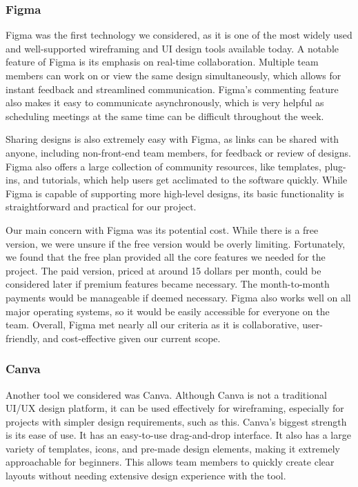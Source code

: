 \documentclass[12pt]{article}
\begin{document}
\subsubsection{Figma}
Figma was the first technology we considered, as it is one of the most widely used and well-supported wireframing and UI design tools available today. A notable feature of Figma is its emphasis on real-time collaboration. Multiple team members can work on or view the same design simultaneously, which allows for instant feedback and streamlined communication. Figma’s commenting feature also makes it easy to communicate asynchronously, which is very helpful as scheduling meetings at the same time can be difficult throughout the week.

Sharing designs is also extremely easy with Figma, as links can be shared with anyone, including non-front-end team members, for feedback or review of designs. Figma also offers a large collection of community resources, like templates, plug-ins, and tutorials, which help users get acclimated to the software quickly. While Figma is capable of supporting more high-level designs, its basic functionality is straightforward and practical for our project.

Our main concern with Figma was its potential cost. While there is a free version, we were unsure if the free version would be overly limiting. Fortunately, we found that the free plan provided all the core features we needed for the project. The paid version, priced at around 15 dollars per month, could be considered later if premium features became necessary. The month-to-month payments would be manageable if deemed necessary. Figma also works well on all major operating systems, so it would be easily accessible for everyone on the team. Overall, Figma met nearly all our criteria as it is collaborative, user-friendly, and cost-effective given our current scope.

\subsubsection{Canva}
Another tool we considered was Canva. Although Canva is not a traditional UI/UX design platform, it can be used effectively for wireframing, especially for projects with simpler design requirements, such as this. Canva's biggest strength is its ease of use. It has an easy-to-use drag-and-drop interface. It also has a large variety of templates, icons, and pre-made design elements, making it extremely approachable for beginners. This allows team members to quickly create clear layouts without needing extensive design experience with the tool.
\end{document}

